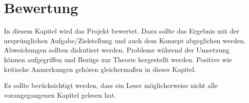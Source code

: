\chapter{Bewertung}

In diesem Kapitel wird das Projekt bewertet. Dazu sollte das Ergebnis mit der ursprünglichen Aufgabe/Zielstellung und auch dem Konzept abgeglichen werden. Abweichungen sollten diskutiert werden. Probleme während der Umsetzung können aufgegriffen und Bezüge zur Theorie hergestellt werden. Positive wie kritische Anmerkungen gehören gleichermaßen in dieses Kapitel.

Es sollte berücksichtigt werden, dass ein Leser möglicherweise nicht alle vorangegangenen Kapitel gelesen hat.